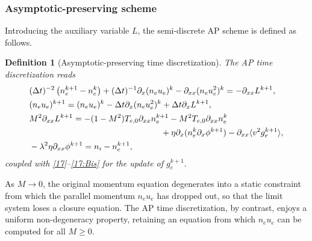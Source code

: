 \documentclass[pdflatex,final,10pt]{article}
\newtheorem{definition}{Definition}[section]
\newcommand{\Del}[1]{#1}
\begin{document}
\subsubsection{Asymptotic-preserving scheme}
\Del{Introducing the auxiliary variable $L$, the} semi-discrete AP scheme is defined as follows.

\begin{definition}[\Del{Asymptotic-preserving time discretization}]\label{def:AP}
\Del{The AP time discretization reads}
\begin{align}
        &(\Delta t)^{-2}\left(n_e^{k+1}-n_e^k \right)+(\Delta t)^{-1}\partial_x(n_e u_e)^k-\partial_{xx}(n_e u_e^2)^k=-\partial_{x\Del{x}}L^{k+1},\label{21}\\
        &(n_eu_e)^{k+1}=(n_eu_e)^k-\Delta t\partial_x(n_eu_e^2)^k+\Delta t\partial_xL^{k+1},\label{22}\\
        &M^2\partial_{x\Del{x}}L^{k+1}=-(1-M^2)T_{e,0}\partial_{x\Del{x}}n_e^{k+1}-M^2T_{e,0}\partial_{x\Del{x}}n_e^{k}\label{23}\\
        &\hspace{5.5cm}+\eta\partial_x(n_e^k\partial_x\phi^{k+1})-\partial_{x\Del{x}}\langle v^2g_e^{k+1} \rangle, \notag\\
        &-\lambda^2\eta\partial_{xx}\phi^{k+1}=n_i-n_e^{k+1},\label{AP-Poi}
\end{align}
\Del{coupled with \eqref{17}--\eqref{17:Bis} for the update of $g_e^{k+1}$.}
\end{definition}
\Del{As $M \to 0$, the original momentum equation degenerates into a static constraint from which the parallel momentum $n_e u_e$ has dropped out, so that the limit system loses a closure equation. The AP time discretization, by contrast, enjoys a uniform non-degeneracy property, retaining an equation from which $n_e u_e$ can be computed for all $M \ge 0$.}
\end{document}
